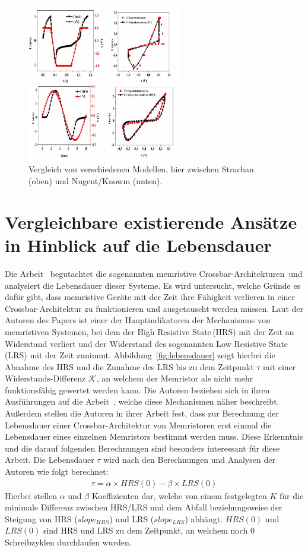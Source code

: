\begin{figure}
  \centering
    \includegraphics[width=0.6\textwidth]{images/Charcterization_Mbarek.png}
  \caption{Vergleich von verschiedenen Modellen, hier zwischen Strachan (oben) und Nugent/Knowm (unten).}
  \label{fig:char_mem}
\end{figure}

\section{Vergleichbare existierende Ansätze in Hinblick auf die Lebensdauer}
\label{sec:Lebensdauer}
Die Arbeit~\cite{stat_lifetime} begutachtet die sogenannten \glqq memristive Crossbar-Architekturen\grqq\, und analysiert die Lebensdauer dieser Systeme. Es wird untersucht, welche Gründe es dafür gibt, dass memristive Geräte mit der Zeit ihre Fähigkeit verlieren in einer Crossbar-Architektur zu funktionieren und ausgetauscht werden müssen. Laut der Autoren des Papers ist einer der Hauptindikatoren der Mechanismus von memristiven Systemen, bei dem der \glqq High Resistive State\grqq\,(HRS) mit der Zeit an Widerstand verliert und der Widerstand des sogenannten \glqq Low Resistive State\grqq\,(LRS) mit der Zeit zunimmt. Abbildung~\ref{fig:lebensdauer} zeigt hierbei die Abnahme des HRS und die Zunahme des LRS bis zu dem Zeitpunkt $\tau$ mit einer Widerstands-Differenz $\mathcal{K}$, an welchem der Memristor als nicht mehr funktionsfähig gewertet werden kann. Die Autoren beziehen sich in ihren Ausführungen auf die Arbeit~\cite{endurance_deg}, welche diese Mechanismen näher beschreibt. Außerdem stellen die Autoren in ihrer Arbeit fest, dass zur Berechnung der Lebensdauer einer Crossbar-Architektur von Memristoren erst einmal die Lebensdauer eines einzelnen Memristors bestimmt werden muss. Diese Erkenntnis und die darauf folgenden Berechnungen sind besonders interessant für diese Arbeit. Die Lebensdauer $\tau$ wird nach den Berechnungen und Analysen der Autoren wie folgt berechnet:
\begin{align*}
  \tau = \alpha \times HRS(0) - \beta \times LRS(0)
\end{align*}
Hierbei stellen $\alpha$ und $\beta$ Koeffizienten dar, welche von einem festgelegten $K$ für die minimale Differenz zwischen HRS/LRS und dem Abfall beziehungsweise der Steigung von HRS ($slope_{HRS}$) und LRS ($slope_{LRS}$) abhängt. $HRS(0)$ und $LRS(0)$ sind HRS und LRS zu dem Zeitpunkt, an welchem noch 0 Schreibzyklen durchlaufen wurden.

